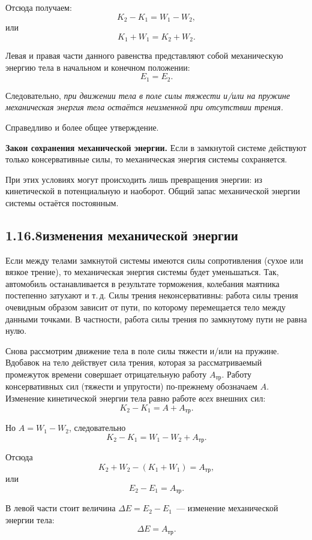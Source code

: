 Отсюда получаем:
\[
K_2-K_1=W_1-W_2,
\]
\noindent или
\[
K_1+W_1=K_2+W_2.
\]

Левая и правая части данного равенства представляют собой механическую энергию тела в начальном и конечном положении:
\[
E_1=E_2.
\]

Следовательно, \textit{при движении тела в поле силы тяже\-сти и/или на пружине механиче\-ская энергия тела остаётся неизменной при отсутствии трения.}

Справедливо и более общее утверждение.

\vspace{5.165pt}\noindent
\textbf{Закон сохране\-ния механи\-ческой энер\-гии.} Если в замкну\-той системе действуют только консервативные силы, то механиче\-ская энергия си\-стемы сохраняется.

\vspace{5.165pt}
При этих условиях могут происходить лишь превращения энер\-гии: из кинетической в по\-тенциальную и наоборот. Общий запас механи\-ческой энер\-гии си\-стемы остаётся постоянным.

\subsection*{1.16.8 изменения механи\-ческой энер\-гии}
\noindent Если между телами замкну\-той си\-стемы имеются силы сопротивления (сухое или вязкое тре\-ние), то механиче\-ская энергия си\-стемы будет уменьшаться. Так, автомобиль останавливается в результате торможения, колебания маятника постепенно затухают и т.\,д. Силы трения неконсер\-вативны: работа силы трения очевидным образом зависит от пути, по которому перемещается тело между данными точками. В частности, работа силы трения по замкнутому пути не равна нулю.

Снова рассмотрим движение тела в поле силы тяже\-сти и/или на пружине. Вдобавок на тело действует сила трения, которая за рассматриваемый промежуток времени совершает отрица\-тельную работу $A_{\text{тр}}$. Работу консервативных сил (тяже\-сти и упру\-гости) по-прежнему обозна\-чаем $A$.
\newpage
Изменение кинетической энер\-гии тела равно работе \textit{всех} внешних сил:
\[
K_2-K_1=A+A_{\text{тр}}.
\]

Но $A=W_1-W_2$, следовательно
\[
K_2-K_1=W_1-W_2+A_{\text{тр}}.
\]

Отсюда
\[
K_2+W_2-(K_1+W_1)=A_{\text{тр}},
\]
\noindent или
\[
E_2-E_1=A_{\text{тр}}.
\]

В левой части стоит величина $\Delta E=E_2-E_1$~--- изменение механи\-ческой энер\-гии тела:
\[
\Delta E=A_{\text{тр}}.
\]

